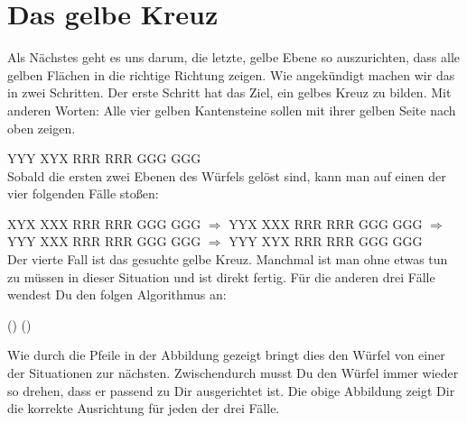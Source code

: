 \section{Das gelbe Kreuz}
\parbox{0.7\linewidth}{
  Als Nächstes geht es uns darum, die letzte, gelbe Ebene so auszurichten, dass alle gelben Flächen in die richtige Richtung zeigen. 
  Wie angekündigt machen wir das in zwei Schritten.
  Der erste Schritt hat das Ziel, ein gelbes Kreuz zu bilden.
  Mit anderen Worten: Alle vier gelben Kantensteine sollen mit ihrer gelben Seite nach oben zeigen.
}
\RubikCubeGreyAll%
            {Y}{Y}{Y}
            {X}{Y}{X}%
               {R}{R}{R}
	       {R}{R}{R}%
	       {G}{G}{G}
	       {G}{G}{G}%
\\[1em]

Sobald die ersten zwei Ebenen des Würfels gelöst sind, kann man auf einen der vier folgenden Fälle stoßen:

\RubikCubeGreyAll%
            {X}{Y}{X}
            {X}{X}{X}%
               {R}{R}{R}
	       {R}{R}{R}%
	       {G}{G}{G}
	       {G}{G}{G}%
$\Longrightarrow$
\RubikCubeGreyAll%
            {Y}{Y}{X}
            {X}{X}{X}%
               {R}{R}{R}
	       {R}{R}{R}%
	       {G}{G}{G}
	       {G}{G}{G}%
$\Longrightarrow$
\RubikCubeGreyAll%
            {Y}{Y}{Y}
            {X}{X}{X}%
               {R}{R}{R}
	       {R}{R}{R}%
	       {G}{G}{G}
	       {G}{G}{G}%
$\Longrightarrow$
\RubikCubeGreyAll%
            {Y}{Y}{Y}
            {X}{Y}{X}%
               {R}{R}{R}
	       {R}{R}{R}%
	       {G}{G}{G}
	       {G}{G}{G}%
\\[1em]

Der vierte Fall ist das gesuchte gelbe Kreuz.
Manchmal ist man ohne etwas tun zu müssen in dieser Situation und ist direkt fertig.
Für die anderen drei Fälle wendest Du den folgen Algorithmus an: \\[1em]
\begin{center}
	\sffamily\Large () ()
\end{center}

Wie durch die Pfeile in der Abbildung gezeigt bringt dies den Würfel von einer der Situationen zur nächsten.
Zwischendurch musst Du den Würfel immer wieder so drehen, dass er passend zu Dir ausgerichtet ist. 
Die obige Abbildung zeigt Dir die korrekte Ausrichtung für jeden der drei Fälle.
